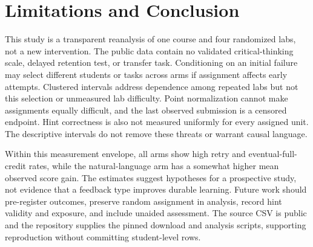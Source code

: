 \documentclass[conference]{IEEEtran}
\begin{document}
\section{Limitations and Conclusion}\label{sec:limits}
This study is a transparent reanalysis of one course and four randomized labs, not a new intervention. The public data contain no validated critical-thinking scale, delayed retention test, or transfer task. Conditioning on an initial failure may select different students or tasks across arms if assignment affects early attempts. Clustered intervals address dependence among repeated labs but not this selection or unmeasured lab difficulty. Point normalization cannot make assignments equally difficult, and the last observed submission is a censored endpoint. Hint correctness is also not measured uniformly for every assigned unit. The descriptive intervals do not remove these threats or warrant causal language.

Within this measurement envelope, all arms show high retry and eventual-full-credit rates, while the natural-language arm has a somewhat higher mean observed score gain. The estimates suggest hypotheses for a prospective study, not evidence that a feedback type improves durable learning. Future work should pre-register outcomes, preserve random assignment in analysis, record hint validity and exposure, and include unaided assessment. The source CSV is public and the repository supplies the pinned download and analysis scripts, supporting reproduction without committing student-level rows.



\end{document}
